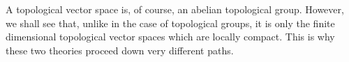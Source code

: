 \begin{remark}
    A topological vector space is, of course, an abelian topological group. However, we shall see that, unlike in the case of topological groups, it is only the finite dimensional topological vector spaces which are locally compact. This is why these two theories proceed down very different paths.
\end{remark}

%
%

